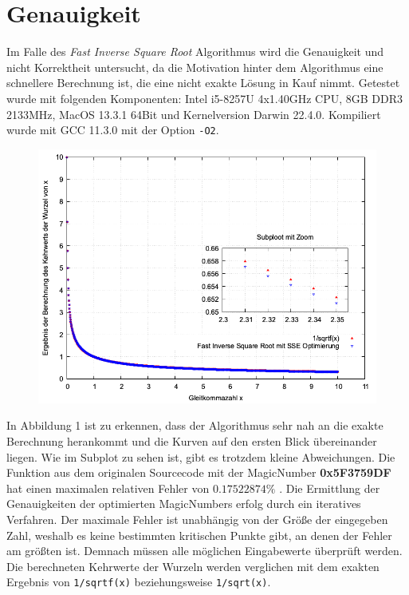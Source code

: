 \documentclass[course=erap]{aspdoc}
\begin{document}
\section{Genauigkeit}
Im Falle des \emph{Fast Inverse Square Root} Algorithmus wird die Genauigkeit und nicht Korrektheit untersucht, da die Motivation hinter dem Algorithmus eine schnellere Berechnung ist, die eine nicht exakte Lösung in Kauf nimmt. Getestet wurde mit folgenden Komponenten: Intel i5-8257U 4x1.40GHz CPU, 8GB DDR3 2133MHz, MacOS 13.3.1 64Bit und Kernelversion Darwin 22.4.0. Kompiliert wurde mit GCC 11.3.0 mit der Option \lstinline{-O2}. \par
\begin{figure}[H]
\centering
  \includegraphics[width=0.8\linewidth]{images/plot_curve.png}
  \label{fig:curve}
\end{figure}
In Abbildung 1 ist zu erkennen, dass der Algorithmus sehr nah an die exakte Berechnung herankommt und die Kurven auf den ersten Blick übereinander liegen. Wie im Subplot zu sehen ist, gibt es trotzdem kleine Abweichungen. Die Funktion aus dem originalen Sourcecode mit der MagicNumber \textbf{0x5F3759DF} hat einen maximalen relativen Fehler von $0.17522874{\%}$ \cite{Robertson}. Die Ermittlung der Genauigkeiten der optimierten MagicNumbers erfolg durch ein iteratives Verfahren. Der maximale Fehler ist unabhängig von der Größe der eingegeben Zahl, weshalb es keine bestimmten kritischen Punkte gibt, an denen der Fehler am größten ist. Demnach müssen alle möglichen Eingabewerte überprüft werden. Die berechneten Kehrwerte der Wurzeln werden verglichen mit dem exakten Ergebnis von \lstinline{1/sqrtf(x)} beziehungsweise \lstinline{1/sqrt(x)}. \par
\end{document}
